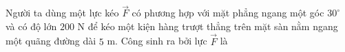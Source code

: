 \begin{ex}
Người ta dùng một lực kéo $\overrightarrow{F}$ có phương hợp với mặt phẳng ngang một góc $30^\circ$ và có độ lớn $200$ N để kéo một kiện hàng trượt thẳng trên mặt sàn nằm ngang một quãng đường dài $5$ m. Công sinh ra bởi lực $\overrightarrow{F}$ là
\end{ex}
